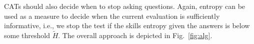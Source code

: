 \documentclass[runningheads]{llncs}
\begin{document}
	
CATs should also decide when to stop asking questions. Again, entropy can be used as 
a measure to decide when the current evaluation is sufficiently informative, i.e., we stop 
the test if the skills entropy given the answers is below some threshold $\tilde{H}$. The 
overall approach is depicted in Fig.~\ref{fig:alg}.
\end{document}
